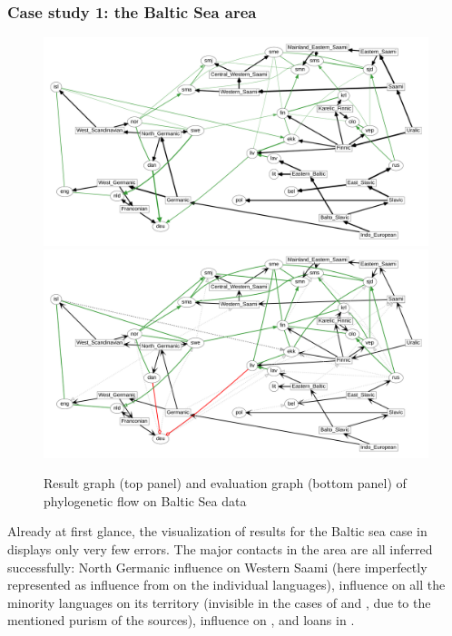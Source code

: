  \subsubsection{Case study 1: the Baltic Sea area}
  \begin{figure}
 \includegraphics[width=\textwidth]{figures/baltic-fs-ufr-ml-multi.pdf}
 \vspace*{5mm}
 \includegraphics[width=\textwidth]{figures/baltic-fs-ufr-ml-multi-eval.pdf}
 \caption{Result graph (top panel) and evaluation graph (bottom panel) of phylogenetic flow on Baltic Sea data}
 \label{baltic-result-phylo}
 \end{figure}
 Already at first glance, the visualization of results for the Baltic sea case in  displays only very few errors. The major contacts in the area are all inferred successfully: North Germanic influence on Western Saami (here imperfectly represented as influence from  on the individual languages),  influence on all the minority languages on its territory (invisible in the cases of  and , due to the mentioned purism of the sources),  influence on , and  loans in .
 

